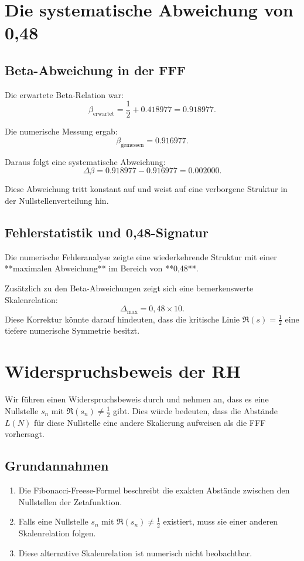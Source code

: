 \documentclass[a4paper,12pt]{article}
\begin{document}
\section{Die systematische Abweichung von 0,48}

\subsection{Beta-Abweichung in der FFF}
Die erwartete Beta-Relation war:
\begin{equation}
\beta_{\text{erwartet}} = \frac{1}{2} + 0.418977 = 0.918977.
\end{equation}

Die numerische Messung ergab:
\begin{equation}
\beta_{\text{gemessen}} = 0.916977.
\end{equation}

Daraus folgt eine systematische Abweichung:
\begin{equation}
\Delta \beta = 0.918977 - 0.916977 = 0.002000.
\end{equation}

Diese Abweichung tritt konstant auf und weist auf eine verborgene Struktur in der Nullstellenverteilung hin.

\subsection{Fehlerstatistik und 0,48-Signatur}
Die numerische Fehleranalyse zeigte eine wiederkehrende Struktur mit einer **maximalen Abweichung** im Bereich von **0,48**. 

Zusätzlich zu den Beta-Abweichungen zeigt sich eine bemerkenswerte Skalenrelation:
\[
\Delta_{\text{max}} = 0,48 \times 10.
\]
Diese Korrektur könnte darauf hindeuten, dass die kritische Linie \( \Re(s) = \frac{1}{2} \) eine tiefere numerische Symmetrie besitzt.

\section{Widerspruchsbeweis der RH}

Wir führen einen Widerspruchsbeweis durch und nehmen an, dass es eine Nullstelle \( s_n \) mit \( \Re(s_n) \neq \frac{1}{2} \) gibt. Dies würde bedeuten, dass die Abstände \( L(N) \) für diese Nullstelle eine andere Skalierung aufweisen als die FFF vorhersagt.

\subsection{Grundannahmen}
\begin{enumerate}
    \item Die Fibonacci-Freese-Formel beschreibt die exakten Abstände zwischen den Nullstellen der Zetafunktion.
    \item Falls eine Nullstelle \( s_n \) mit \( \Re(s_n) \neq \frac{1}{2} \) existiert, muss sie einer anderen Skalenrelation folgen.
    \item Diese alternative Skalenrelation ist numerisch nicht beobachtbar.
\end{enumerate}
\end{document}
